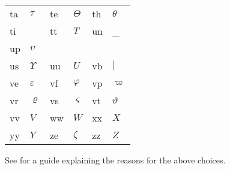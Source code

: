 \begin{table}[tbph]
\begin{center}
\begin{tabular}{||p{1.5cm}|p{4cm}||p{1.5cm}|p{4cm}||p{1.5cm}|p{4cm}||}
ta & $\tau$ & te & $\Theta$ & th & $\theta$ \\
ti & $~$ & tt & $T$ & un & \_ \\
up & $\upsilon$ && && \\
us & $\Upsilon$ & uu & $U$ & vb & $|$ \\
ve & $\varepsilon$ & vf & $\varphi$ & vp & $\varpi$ \\
vr & $\varrho$ & vs & $\varsigma$ & vt & $\vartheta$ \\
vv & $V$ & ww & $W$ & xx & $X$ \\
yy & $Y$ & ze & $\zeta$ & zz & $Z$ \\
\hline
\end{tabular}
See  for a guide explaining the reasons for the above choices.
\end{center}
\end{table}

